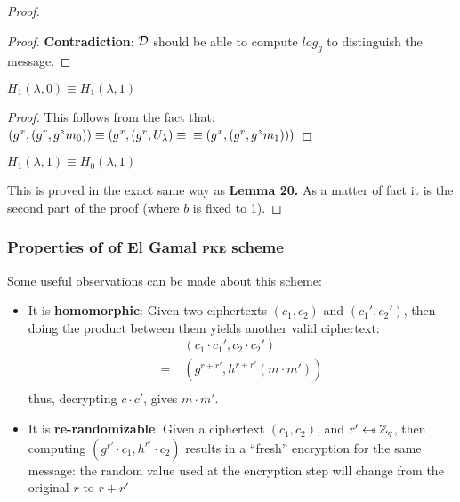 \begin{proof}
\begin{proof}
        \textbf{Contradiction}: $\mathcal{D}$ should be able to compute $log_g$ to distinguish the message.

    \end{proof}

    \begin{lemma}
        $H_1(\lambda,0)\equiv H_1(\lambda,1)$
    \end{lemma}
    \begin{proof}
        This follows from the fact that:
        $(g^x,(g^r,g^z m_0))\equiv (g^x,(g^r,U_{\lambda}) \equiv \\ \equiv (g^x,(g^r,g^z m_1)))$
    \end{proof}
    
    \begin{lemma}
        $H_1(\lambda,1)\equiv H_0(\lambda,1)$
    \end{lemma}
    This is proved in the exact same way as \textbf{Lemma 20.} As a matter of fact it is the second part of the proof (where $b$ is fixed to 1).
    
\end{proof}

\subsubsection{Properties of of El Gamal \textsc{pke} scheme}

Some useful observations can be made about this scheme:
\begin{itemize}
    \item It is \textbf{homomorphic}: Given two ciphertexts $(c_1, c_2)$ and $(c_1', c_2')$, then doing the product between them yields another valid ciphertext:
    \begin{align*}
        & (c_1\cdot c_1', c_2\cdot c_2') \\
        =\;& (g^{r+r'}, h^{r+r'}(m\cdot m')) \\
    \end{align*}
    thus, decrypting $c\cdot c'$, gives $m\cdot m'$.

    \item It is \textbf{re-randomizable}: Given a ciphertext $(c_1, c_2)$, and $r' \pickUAR \mathbb{Z}_q$, then computing $(g^{r'}\cdot c_1, h^{r'}\cdot c_2)$ results in a ``fresh'' encryption for the same message: the random value used at the encryption step will change from the original $r$ to $r+r'$
\end{itemize}

